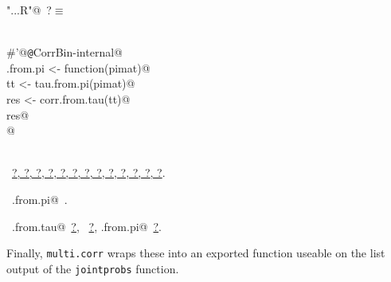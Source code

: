 \documentclass[reqno]{amsart}
\renewcommand{\NWtarget}[2]{\hypertarget{#1}{#2}}
\renewcommand{\NWlink}[2]{\hyperlink{#1}{#2}}
\begin{document}
\begin{flushleft} \small\label{scrap42}\raggedright\small
\NWtarget{nuweb?}{} \verb@"..\R\ExchMultinomial.R"@\nobreak\ {\footnotesize {?}}$\equiv$
\vspace{-1ex}
\begin{list}{}{} \item
\mbox{}\verb@@\\
\mbox{}\verb@#'@{\tt @}\verb@rdname CorrBin-internal@\\
\mbox{}\verb@corr.from.pi <- function(pimat){@\\
\mbox{}\verb@  tt <- tau.from.pi(pimat)@\\
\mbox{}\verb@  res <- corr.from.tau(tt)@\\
\mbox{}\verb@  res@\\
\mbox{}\verb@}@\\
\mbox{}\verb@@\\
\mbox{}\verb@@{\NWsep}
\end{list}
\vspace{-1.5ex}
\footnotesize
\begin{list}{}{\setlength{\itemsep}{-\parsep}\setlength{\itemindent}{-\leftmargin}}
\item \NWtxtFileDefBy\ \NWlink{nuweb?}{?}\NWlink{nuweb?}{, ?}\NWlink{nuweb?}{, ?}\NWlink{nuweb?}{, ?}\NWlink{nuweb?}{, ?}\NWlink{nuweb?}{, ?}\NWlink{nuweb?}{, ?}\NWlink{nuweb?}{, ?}\NWlink{nuweb?}{, ?}\NWlink{nuweb?}{, ?}\NWlink{nuweb?}{, ?}\NWlink{nuweb?}{, ?}\NWlink{nuweb?}{, ?}.
\item \NWtxtIdentsDefed\nobreak\  \verb@corr.from.pi@\nobreak\ \NWtxtIdentsNotUsed.\item \NWtxtIdentsUsed\nobreak\  \verb@corr.from.tau@\nobreak\ \NWlink{nuweb?}{?}, \verb@tau@\nobreak\ \NWlink{nuweb?}{?}, \verb@tau.from.pi@\nobreak\ \NWlink{nuweb?}{?}.
\item{}
\end{list}
\vspace{4ex}
\end{flushleft}
Finally, \texttt{multi.corr} wraps these into an exported function useable on the list output of the
\texttt{jointprobs} function.
\end{document}
